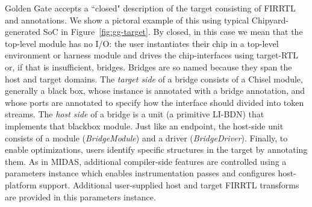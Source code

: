 Golden Gate accepts a ``closed" description of the target
consisting of FIRRTL and annotations. We show a pictoral example of this using
typical Chipyard-generated SoC in Figure~\ref{fig:gg-target}. By closed, in
this case we mean that the top-level module has no I/O: the user instantiates their chip in a top-level
environment or harness module and drives the chip-interfaces using target-RTL
or, if that is insufficient, bridges. Bridges are so named because they span
the host and target domains. The \emph{target side} of a bridge consists of a
Chisel module, generally a black box, whose instance is annotated with a bridge annotation,
and whose ports are annotated to specify how the
interface should divided into token streams. The \emph{host side} of a bridge is a unit (a
primitive LI-BDN) that implements that blackbox module. Just like an endpoint,
the host-side unit consists of a module (\emph{BridgeModule}) and a driver
(\emph{BridgeDriver}). Finally, to enable optimizations, users
identify specific structures in the target by annotating them. As in MIDAS, additional compiler-side features are controlled using a
parameters instance which enables instrumentation passes and configures host-platform support.
Additional user-supplied host and target FIRRTL transforms are provided in this parameters instance.


